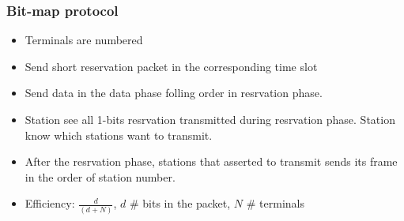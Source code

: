 \subsubsection{Bit-map protocol}
\begin{itemize}
	\item Terminals are numbered
	\item Send short reservation packet in the corresponding time slot
	\item Send data in the data phase folling order in resrvation phase.
	\item Station see all 1-bits resrvation transmitted during resrvation phase. Station know which stations want to transmit.
	\item After the resrvation phase, stations that asserted to transmit sends its frame in the order of station number.
	\item Efficiency: $\frac{d}{(d + N)}$, $d$ \# bits in the packet, $N$ \# terminals
\end{itemize}
